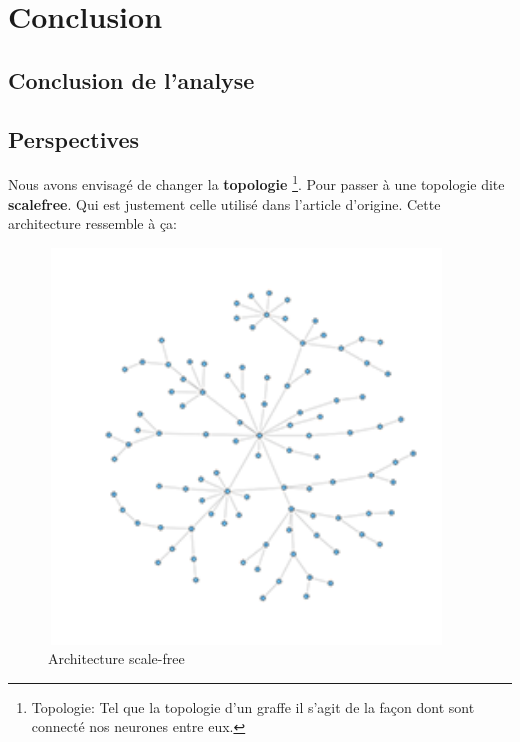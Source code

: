 \hypertarget{conclusion}{%
\chapter{Conclusion}\label{conclusion}}

\section{Conclusion de l'analyse}



\section{Perspectives}

Nous avons envisagé de changer la \textbf{topologie} \footnote{Topologie: Tel que la topologie d'un graffe il s'agit de la façon dont sont connecté nos neurones entre eux.}. Pour passer à une topologie dite \textbf{scalefree}. Qui est justement celle utilisé dans l'article d'origine. Cette architecture ressemble à ça:

\begin{figure}[h!]
\begin{center}
\includegraphics[width=10.5cm,height=10.5cm]{./images/scalefree.png}
\end{center}
\caption{Architecture scale-free}
\label{scale_free}
\end{figure}
